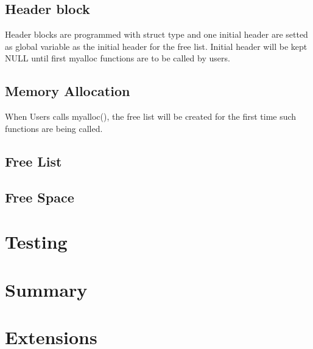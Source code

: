 \documentclass[legalpaper]{article}
\begin{document}
	\subsection{Header block}
	Header blocks are programmed with struct type and one initial header are setted as global variable as the initial header for the free list. Initial header will be kept NULL until first myalloc functions are to be called by users.
	\subsection{Memory Allocation}
	When Users calls myalloc(), the free list will be created for the first time such functions are being called.
	\subsection{Free List}
	\subsection{Free Space} 	

	
	\section{Testing}
	
	\section{Summary}
	
	\section{Extensions}
\end{document}
